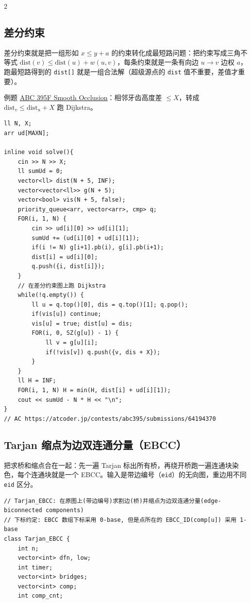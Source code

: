 \begin{multicols*}{2}
		\subsection{差分约束}

		差分约束就是把一组形如 $x \leq y + a$ 的约束转化成最短路问题：把约束写成三角不等式 $\mathrm{dist}(v) \leq \mathrm{dist}(u) + w(u, v)$，每条约束就是一条有向边 $u \to v$ 边权 $a$，跑最短路得到的 \texttt{dist[]} 就是一组合法解（超级源点的 \texttt{dist} 值不重要，差值才重要）。

		例题 \href{https://atcoder.jp/contests/abc395/tasks/abc395_f}{ABC 395F Smooth Occlusion}：相邻牙齿高度差 $\leq X$，转成 $\mathrm{dist}_v \leq \mathrm{dist}_u + X$ 跑 Dijkstra。

		\begin{verbatim}
ll N, X;
arr ud[MAXN];

inline void solve(){
    cin >> N >> X;
    ll sumUd = 0;
    vector<ll> dist(N + 5, INF);
    vector<vector<ll>> g(N + 5);
    vector<bool> vis(N + 5, false);
    priority_queue<arr, vector<arr>, cmp> q;
    FOR(i, 1, N) {
        cin >> ud[i][0] >> ud[i][1];
        sumUd += (ud[i][0] + ud[i][1]);
        if(i != N) g[i+1].pb(i), g[i].pb(i+1);
        dist[i] = ud[i][0];
        q.push({i, dist[i]});
    }
    // 在差分约束图上跑 Dijkstra
    while(!q.empty()) {
        ll u = q.top()[0], dis = q.top()[1]; q.pop();
        if(vis[u]) continue;
        vis[u] = true; dist[u] = dis;
        FOR(i, 0, SZ(g[u]) - 1) {
            ll v = g[u][i];
            if(!vis[v]) q.push({v, dis + X});
        }
    }
    ll H = INF;
    FOR(i, 1, N) H = min(H, dist[i] + ud[i][1]);
    cout << sumUd - N * H << "\n";
}
// AC https://atcoder.jp/contests/abc395/submissions/64194370
		\end{verbatim}

		\subsection{Tarjan 缩点为边双连通分量（EBCC）}

		把求桥和缩点合在一起：先一遍 Tarjan 标出所有桥，再绕开桥跑一遍连通块染色，每个连通块就是一个 EBCC。输入是带边编号（\texttt{eid}）的无向图，重边用不同 \texttt{eid} 区分。

		\begin{verbatim}
// Tarjan_EBCC: 在原图上(带边编号)求割边(桥)并缩点为边双连通分量(edge-biconnected components)
// 下标约定: EBCC 数组下标采用 0-base, 但是点所在的 EBCC_ID(comp[u]) 采用 1-base
class Tarjan_EBCC {
    int n;
    vector<int> dfn, low;
    int timer;
    vector<int> bridges;
    vector<int> comp;
    int comp_cnt;


\end{verbatim}
\end{multicols*}
